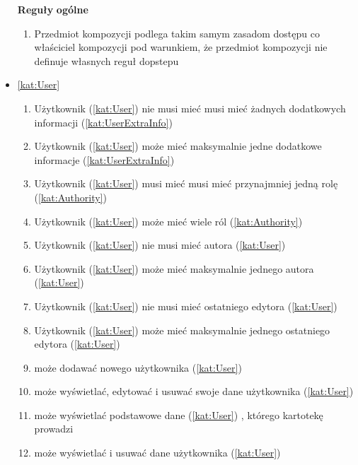 \begin{itemize}[label={\textbf{Reguły dla}}, wide, labelwidth=!, labelindent=0pt]
    \setlength\itemsep{1em}
    \item[\textbf{Reguły}] \textbf{ogólne}
    \begin{enumerate}[label={\textbf{REG/\protect\threedigits{\arabic{enumi}}}}, wide, labelwidth=!, align=left, leftmargin=3cm]
        \item Przedmiot kompozycji podlega takim samym zasadom dostępu co właściciel kompozycji pod warunkiem, że przedmiot kompozycji nie definuje własnych reguł dopstepu
    \end{enumerate}
    \item\ref{kat:User}
    \begin{enumerate}[label={\textbf{REG/\protect\threedigits{\arabic{enumi}}}}, wide, labelwidth=!, align=left, leftmargin=3cm, resume]
        \item Użytkownik (\ref{kat:User}) nie musi mieć musi mieć żadnych dodatkowych informacji (\ref{kat:UserExtraInfo})
        \item Użytkownik (\ref{kat:User}) może mieć maksymalnie jedne dodatkowe informacje (\ref{kat:UserExtraInfo})
        \item Użytkownik (\ref{kat:User}) musi mieć musi mieć przynajmniej jedną rolę (\ref{kat:Authority})
        \item Użytkownik (\ref{kat:User}) może mieć wiele ról (\ref{kat:Authority})
        \item Użytkownik (\ref{kat:User}) nie musi mieć autora (\ref{kat:User})
        \item Użytkownik (\ref{kat:User}) może mieć maksymalnie jednego autora (\ref{kat:User})
        \item Użytkownik (\ref{kat:User}) nie musi mieć ostatniego edytora (\ref{kat:User})
        \item Użytkownik (\ref{kat:User}) może mieć maksymalnie jednego ostatniego edytora (\ref{kat:User})
        \item {} może dodawać nowego użytkownika (\ref{kat:User})
        \item {} może wyświetlać, edytować i usuwać swoje dane użytkownika (\ref{kat:User})
        \item {} może wyświetlać podstawowe dane (\ref{kat:User}) , którego kartotekę prowadzi
        \item {} może wyświetlać i usuwać dane użytkownika (\ref{kat:User})

\end{enumerate}
\end{itemize}
